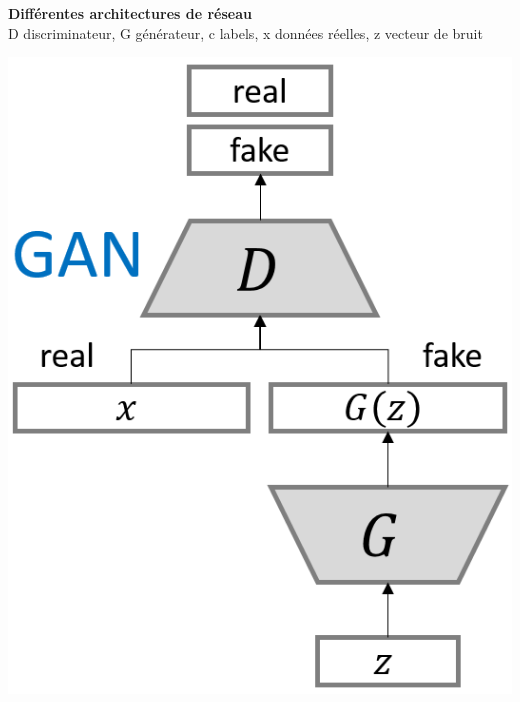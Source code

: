 \documentclass[a0,portrait]{a0poster}
\begin{document}
\begin{multicols}{2}
\begin{tcolorbox}[colback=blue!5!white,colframe=blue!75!black,title={\section*{Différents types de GAN}}]
\textbf{Différentes architectures de réseau}\\
D discriminateur, G générateur, c labels, x données réelles, z vecteur de bruit
\begin{center}
\begin{minipage}{0.24\textwidth}
    \includegraphics[width=1.0\textwidth]{./GAN_normal.png}
\end{minipage}
\begin{minipage}{0.31\textwidth}

\end{minipage}
\end{center}
\end{tcolorbox}
\end{multicols}
\end{document}
